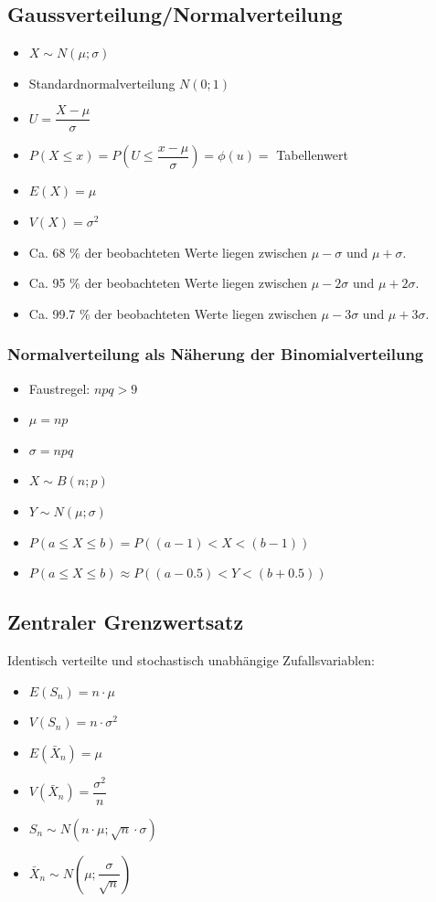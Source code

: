 \documentclass[8pt,a4paper]{scrartcl}
\begin{document}
\begin{multicols*}{3}
			\subsection{Gaussverteilung/Normalverteilung}
				\begin{itemize}\itemsep0pt				
					\item $X \sim N(\mu ;\sigma )$
					\item Standardnormalverteilung $N(0;1)$
					\item $U=\dfrac{X-\mu}{\sigma}$
					\item $P(X\leq x)= P(U \leq \dfrac{x-\mu}{\sigma}) = \phi(u)=$ Tabellenwert
					\item $E(X)=\mu$
					\item $V(X)=\sigma^{2}$
					\item Ca. 68 \% der beobachteten Werte liegen zwischen $\mu - \sigma$ und $\mu + \sigma$.
					\item Ca. 95 \% der beobachteten Werte liegen zwischen $\mu - 2\sigma$ und $\mu + 2\sigma$.
					\item Ca. 99.7 \% der beobachteten Werte liegen zwischen $\mu - 3\sigma$ und $\mu + 3\sigma$.
				\end{itemize}	
				
				\subsubsection{Normalverteilung als Näherung der Binomialverteilung}		
					\begin{itemize}\itemsep0pt				
						\item Faustregel: $npq > 9$
						\item $\mu = np$
						\item $\sigma = npq$
						\item $X \sim B(n;p)$
						\item $Y \sim N(\mu;\sigma)$
						\item $P(a\leq X \leq b) = P((a-1) < X < (b-1)) $
						\item $P(a\leq X \leq b) \approx P((a-0.5) < Y < (b+0.5)) $
					\end{itemize}			
				
			\subsection{Zentraler Grenzwertsatz}
			 Identisch verteilte und stochastisch unabhängige Zufallsvariablen:
			 \begin{itemize}\itemsep0pt				
					\item $E(S_{n})=n\cdot \mu$
					\item $V(S_{n})=n\cdot \sigma^{2}$
					\item $E(\bar{X}_{n})=\mu$
					\item $V(\bar{X}_{n})=\dfrac{\sigma^{2}}{n}$
					\item $S_{n} \sim N(n\cdot \mu ;\sqrt{n}\cdot \sigma )$
					\item $\bar{X}_{n}  \sim N(\mu ; \dfrac{\sigma}{\sqrt{n}} )$
				\end{itemize}	
				

\end{multicols*}
\end{document}
